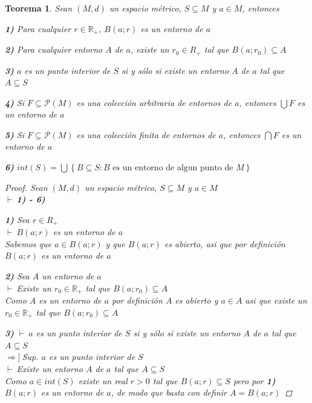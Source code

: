 \documentclass[oneside]{book} %
\theoremstyle{Teorema}
\newtheorem{Teorema}[Definicion]{Teorema}
\theoremstyle{Ejemplos}
\theoremstyle{[Obs]}
\renewcommand{\{}{\left\lbrace} %
\renewcommand{\}}{\right\rbrace} %
\newcommand{\U}{\bigcup} %
\newcommand{\N}{\bigcap} %
\renewcommand{\sc}{\subseteq} %
\newcommand{\R}{\mathbb{R}} %
\renewcommand{\P}{\mathcal{P}} %
\newcommand{\pd}{$\vdash\ $} %
\newcommand{\necesidad}{$\Rightarrow]\ $} %
\begin{document}
			\begin{Teorema}\setlength{\parindent}{0em}
				
				Sean $(M, d)$ un espacio métrico, $S \sc M$ y $a \in M$, entonces 
				
				\textbf{1)} Para cualquier $r \in \R_{+}$, $B(a;r)$ es un entorno de $a$

				\textbf{2)} Para cualquier entorno $A$ de $a$, existe un $r_0 \in R_{+}$ tal que $B(a;r_0) \sc A$

				\textbf{3)} $a$ es un punto interior de $S$ si y sólo si existe un entorno $A$ de $a$ tal que $A \sc S$

				\textbf{4)} Si $F \sc \P(M)$ es una colección arbitraria de entornos de $a$, entonces $\U F$ es un entorno de $a$ 

				\textbf{5)} Si $F \sc \P(M)$ es una colección finita de entornos de $a$, entonces $\N F$ es un entorno de $a$ 

				\textbf{6)} $int(S) = \U\{ B \sc S : B \text{ es un entorno de algun punto de } M \}$

				\begin{proof}
					
					Sean $(M, d)$ un espacio métrico, $S \sc M$ y $a \in M$ \\ 
					\pd \textbf{1) - 6)}

					\textbf{1)} Sea $r \in R_{+}$ \\ 
					\pd $B(a;r)$ es un entorno de $a$ \\
					Sabemos que $a \in B(a;r)$ y que $B(a;r)$ es abierto, asi que por definición $B(a;r)$ es un entorno de $a$

					\textbf{2)} Sea $A$ un entorno de $a$ \\ 
					\pd Existe un $r_0 \in \R_{+}$ tal que $B(a;r_0) \sc A$ \\ 
					Como $A$ es un entorno de $a$ por definición $A$ es abierto y $a \in A$ asi que existe un $r_0 \in \R_{+}$ tal que $B(a;r_0) \sc A$ 

					\textbf{3)} \pd $a$ es un punto interior de $S$ si y sólo si existe un entorno $A$ de $a$ tal que $A \sc S$ \\ 
					\necesidad Sup. $a$ es un punto interior de $S$ \\ 
					\pd Existe un entorno $A$ de $a$ tal que $A \sc S$ \\ 
					Como $a \in int(S)$ existe un real $r > 0$ tal que $B(a;r) \sc S$ pero por \textbf{1)} $B(a;r)$ es un entorno de $a$, de modo que basta con definir $A = B(a;r)$


\end{proof}
\end{Teorema}
\end{document}
